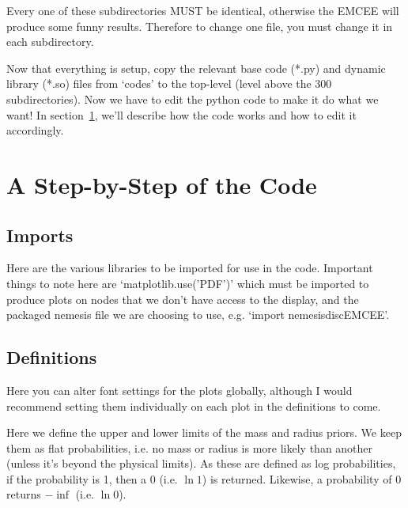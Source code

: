 \documentclass[11pt, a4paper,titlepage]{report}
\begin{document}
Every one of these subdirectories MUST be identical, otherwise the EMCEE will produce some funny results. Therefore to change one file, you must change it in each subdirectory. 

Now that everything is setup, copy the relevant base code (*.py) and dynamic library (*.so) files from `codes' to the top-level (level above the 300 subdirectories). Now we have to edit the python code to make it do what we want! In section~\ref{sec:step}, we'll describe how the code works and how to edit it accordingly. 

\section{A Step-by-Step of the Code}\label{sec:step}

\subsection{Imports}



Here are the various libraries to be imported for use in the code. Important things to note here are `matplotlib.use('PDF')' which must be imported to produce plots on nodes that we don't have access to the display, and the packaged nemesis file we are choosing to use, e.g. `import nemesisdiscEMCEE'.

\subsection{Definitions}



Here you can alter font settings for the plots globally, although I would recommend setting them individually on each plot in the definitions to come.



Here we define the upper and lower limits of the mass and radius priors. We keep them as flat probabilities, i.e. no mass or radius is more likely than another (unless it's beyond the physical limits). As these are defined as log probabilities, if the probability is 1, then a 0 (i.e. $\ln{1}$) is returned. Likewise, a probability of 0 returns $-\inf$ (i.e. $\ln{0}$). 
\end{document}
